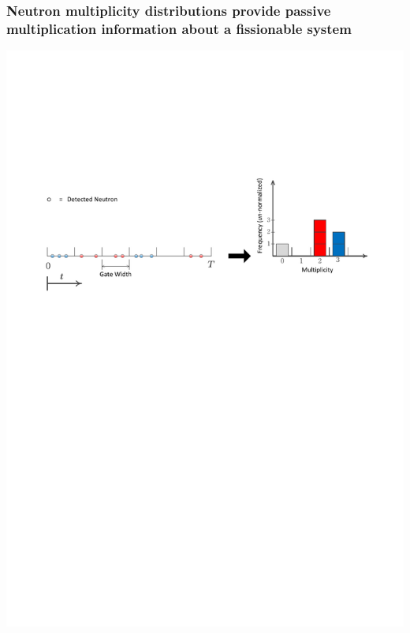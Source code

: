 \documentclass[xcolor=dvipsnames,hyperref={pdfpagelabels=false},unknownkeysallowed]{beamer}
\begin{document}
\begin{frame}
\frametitle{Neutron multiplicity distributions provide passive \\ multiplication
information about a fissionable system}
 \centering
 \includegraphics[trim=0.7in 6.075in 0.6in 2.0in,clip,width=1.0\textwidth]{neutron_hist.pdf}

\end{frame}
\end{document}
